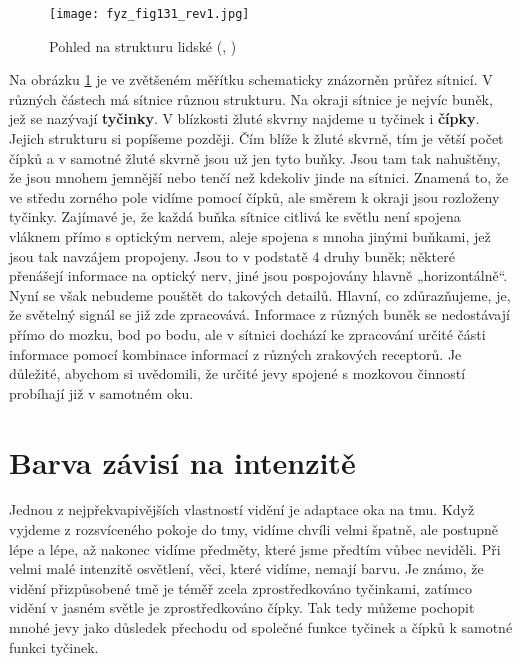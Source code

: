     \begin{figure}[ht!]  %
      \centering
      \texttt{[image: fyz\_fig131\_rev1.jpg]}
      \caption{Pohled na strukturu lidské \WebvisionRetina 
               (\cite[s.~468]{Feynman01}, \cite{Webvision})}
      \label{fyz:fig131}
    \end{figure}
    Na obrázku \ref{fyz:fig131} je ve zvětšeném měřítku schematicky znázorněn průřez sítnicí. V 
    různých částech má sítnice různou strukturu. Na okraji sítnice je nejvíc buněk, jež se nazývají 
    \textbf{tyčinky}. V blízkosti žluté skvrny najdeme u tyčinek i \textbf{čípky}. Jejich strukturu 
    si popíšeme později. Čím blíže k žluté skvrně, tím je větší počet čípků a v samotné žluté 
    skvrně jsou už jen tyto buňky. Jsou tam tak nahuštěny, že jsou mnohem jemnější nebo tenčí než 
    kdekoliv jinde na sítnici. Znamená to, že ve středu zorného pole vidíme pomocí čípků, ale 
    směrem k okraji jsou rozloženy tyčinky. Zajímavé je, že každá buňka sítnice citlivá ke světlu 
    není spojena vláknem přímo s optickým nervem, aleje spojena s mnoha jinými buňkami, jež jsou 
    tak navzájem propojeny. Jsou to v podstatě \(4\) druhy buněk; některé přenášejí informace na 
    optický nerv, jiné jsou pospojovány hlavně „horizontálně“. Nyní se však nebudeme pouštět do 
    takových detailů. Hlavní, co zdůrazňujeme, je, že světelný signál se již zde zpracovává. 
    Informace z různých buněk se nedostávají přímo do mozku, bod po bodu, ale v sítnici dochází ke 
    zpracování určité části informace pomocí kombinace informací z různých zrakových receptorů. Je 
    důležité, abychom si uvědomili, že určité jevy spojené s mozkovou činností probíhají již v 
    samotném oku.
    
  \section{Barva závisí na intenzitě}\label{fyz:IchapXXXVsecII}
    Jednou z nejpřekvapivějších vlastností vidění je adaptace oka na tmu. Když vyjdeme z 
    rozsvíceného pokoje do tmy, vidíme chvíli velmi špatně, ale postupně lépe a lépe, až nakonec 
    vidíme předměty, které jsme předtím vůbec neviděli. Při velmi malé intenzitě osvětlení, věci, 
    které vidíme, nemají barvu. Je známo, že vidění přizpůsobené tmě je téměř zcela zprostředkováno 
    tyčinkami, zatímco vidění v jasném světle je zprostředkováno čípky. Tak tedy můžeme pochopit 
    mnohé jevy jako důsledek přechodu od společné funkce tyčinek a čípků k samotné funkci tyčinek.
    
